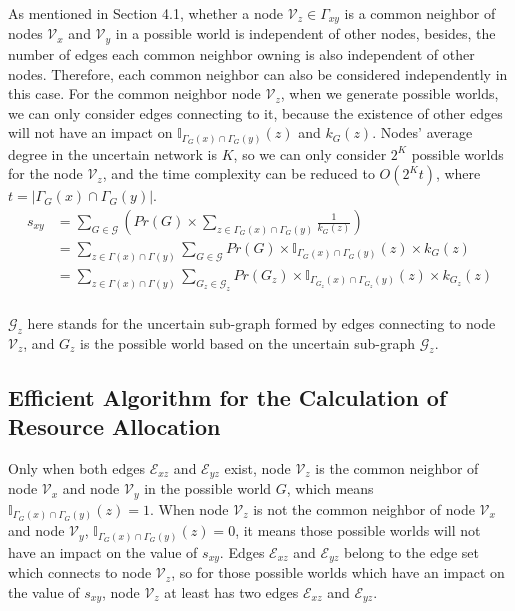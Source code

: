 \documentclass[\main/thesis.tex]{subfiles}
\begin{document}
As mentioned in Section 4.1, whether a node $\mathcal{V}_z \in \Gamma_{xy}$ is a common neighbor of nodes $\mathcal{V}_x$ and $\mathcal{V}_y$ in a possible world is independent of other nodes, besides, the number of edges each common neighbor owning is also independent of other nodes.  Therefore, each common neighbor can also be considered independently in this case. For the common neighbor node $\mathcal{V}_z$, when we generate possible worlds, we can only consider edges connecting to it, because the existence of other edges will not have an impact on $\mathbb{I}_{\Gamma_G(x)\cap\Gamma_G(y)}(z)$ and $k_G(z)$. Nodes' average degree in the uncertain network is $K$, so we can only consider $2^K$ possible worlds for the node $\mathcal{V}_z$, and the time complexity can be reduced to $O(2^{K}t)$, where $t=|\Gamma_G(x)\cap\Gamma_G(y)|$. 
\begin{align*}
s_{xy}&=\sum_{G\in \mathcal{G}}( Pr(G)\times\sum_{z\in \Gamma_G(x)\cap\Gamma_G(y)}\frac{1}{k_G(z)})\\
&=\sum_{z\in \Gamma(x)\cap\Gamma(y)}\sum_{G\in \mathcal{G}}Pr(G)\times\mathbb{I}_{\Gamma_G(x)\cap\Gamma_G(y)}(z)\times k_G(z)\\
&=\sum_{z\in \Gamma(x)\cap\Gamma(y)}\sum_{{G_z}\in \mathcal{G}_z}Pr({G_z})\times\mathbb{I}_{\Gamma_{G_z}(x)\cap\Gamma_{G_z}(y)}(z)\times k_{G_z}(z)\\
\end{align*}

$\mathcal{G}_z$ here stands for the uncertain sub-graph formed by edges connecting to node $\mathcal{V}_z$, and $G_z$ is the possible world based on the uncertain sub-graph $\mathcal{G}_z$.

\subsection{Efficient Algorithm for the Calculation of Resource Allocation}

Only when both edges $\mathcal{E}_{xz}$ and $\mathcal{E}_{yz}$ exist, node $\mathcal{V}_z$ is the common neighbor of node $\mathcal{V}_x$ and node $\mathcal{V}_y$ in the possible world $G$, which means $\mathbb{I}_{\Gamma_G(x)\cap\Gamma_G(y)}(z)=1$. When node $\mathcal{V}_z$ is not the common neighbor of node $\mathcal{V}_x$ and node $\mathcal{V}_y$, $\mathbb{I}_{\Gamma_G(x)\cap\Gamma_G(y)}(z)=0$, it means those possible worlds will not have an impact on the value of $s_{xy}$. Edges $\mathcal{E}_{xz}$ and $\mathcal{E}_{yz}$ belong to the edge set which connects to node $\mathcal{V}_z$, so for those possible worlds which have an impact on the value of $s_{xy}$, node $\mathcal{V}_z$ at least has two edges $\mathcal{E}_{xz}$ and $\mathcal{E}_{yz}$.
\end{document}

